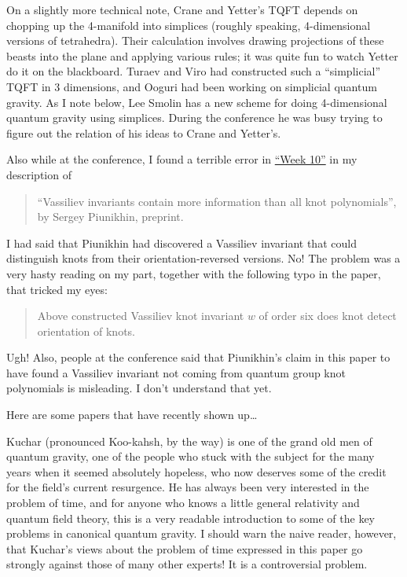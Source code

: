 \documentclass{article}
\def\tightlist{}
\renewcommand{\texttt}[1]{%
  \begingroup
  \ttfamily
  \begingroup\lccode`~=`/\lowercase{\endgroup\def~}{/\discretionary{}{}{}}%
  \begingroup\lccode`~=`[\lowercase{\endgroup\def~}{[\discretionary{}{}{}}%
  \begingroup\lccode`~=`.\lowercase{\endgroup\def~}{.\discretionary{}{}{}}%
  \catcode`/=\active\catcode`[=\active\catcode`.=\active
  \scantokens{#1\noexpand}%
  \endgroup
}
\begin{document}
On a slightly more technical note, Crane and Yetter's TQFT depends on
chopping up the 4-manifold into simplices (roughly speaking,
4-dimensional versions of tetrahedra). Their calculation involves
drawing projections of these beasts into the plane and applying various
rules; it was quite fun to watch Yetter do it on the blackboard. Turaev
and Viro had constructed such a ``simplicial'' TQFT in 3 dimensions, and
Ooguri had been working on simplicial quantum gravity. As I note below,
Lee Smolin has a new scheme for doing 4-dimensional quantum gravity
using simplices. During the conference he was busy trying to figure out
the relation of his ideas to Crane and Yetter's.

Also while at the conference, I found a terrible error in
\protect\hyperlink{week10}{``Week 10''} in my description of

\begin{quote}
``Vassiliev invariants contain more information than all knot
polynomials'', by Sergey Piunikhin, preprint.
\end{quote}

I had said that Piunikhin had discovered a Vassiliev invariant that
could distinguish knots from their orientation-reversed versions. No!
The problem was a very hasty reading on my part, together with the
following typo in the paper, that tricked my eyes:

\begin{quote}
Above constructed Vassiliev knot invariant \(w\) of order six does knot
detect orientation of knots.
\end{quote}

Ugh! Also, people at the conference said that Piunikhin's claim in this
paper to have found a Vassiliev invariant not coming from quantum group
knot polynomials is misleading. I don't understand that yet.

Here are some papers that have recently shown up\ldots{}


Kuchar (pronounced Koo-kahsh, by the way) is one of the grand old men of
quantum gravity, one of the people who stuck with the subject for the
many years when it seemed absolutely hopeless, who now deserves some of
the credit for the field's current resurgence. He has always been very
interested in the problem of time, and for anyone who knows a little
general relativity and quantum field theory, this is a very readable
introduction to some of the key problems in canonical quantum gravity. I
should warn the naive reader, however, that Kuchar's views about the
problem of time expressed in this paper go strongly against those of
many other experts! It is a controversial problem.
\end{document}
